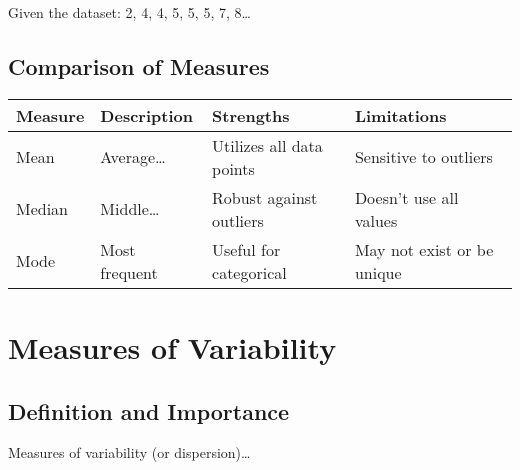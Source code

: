 \documentclass[
  letterpaper,
  DIV=11,
  numbers=noendperiod]{scrreprt}
\begin{document}
Given the dataset: 2, 4, 4, 5, 5, 5, 7, 8\ldots{}

\section{Comparison of Measures}\label{comparison-of-measures}

\begin{longtable}[]{@{}
  >{\raggedright\arraybackslash}p{}
  >{\raggedright\arraybackslash}p{}
  >{\raggedright\arraybackslash}p{}
  >{\raggedright\arraybackslash}p{}@{}}
\toprule\noalign{}
\begin{minipage}[b]{\linewidth}\raggedright
Measure
\end{minipage} & \begin{minipage}[b]{\linewidth}\raggedright
Description
\end{minipage} & \begin{minipage}[b]{\linewidth}\raggedright
Strengths
\end{minipage} & \begin{minipage}[b]{\linewidth}\raggedright
Limitations
\end{minipage} \\
\midrule\noalign{}
\endhead
\bottomrule\noalign{}
\endlastfoot
Mean & Average\ldots{} & Utilizes all data points & Sensitive to
outliers \\
Median & Middle\ldots{} & Robust against outliers & Doesn't use all
values \\
Mode & Most frequent & Useful for categorical & May not exist or be
unique \\
\end{longtable}


\chapter{Measures of Variability}\label{measures-of-variability}

\section{Definition and Importance}\label{definition-and-importance-1}

Measures of variability (or dispersion)\ldots{}
\end{document}
